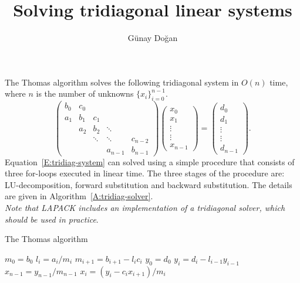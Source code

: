 \documentclass[10pt,a4paper]{article}
\author{G\"unay Do\u gan}
\title{Solving tridiagonal linear systems}
\begin{document}
\maketitle

The Thomas algorithm solves the following tridiagonal system in $O(n)$ time, 
where $n$ is the number of unknowns $\{x_i\}_{i=0}^{n-1}$.
%
\begin{equation}\label{E:tridiag-system}
{\scriptscriptstyle
  \left(\begin{array}{ccccc}
     b_0 & c_0 &        &         &         \\
     a_1 & b_1 &  c_1   &         &         \\
         & a_2 &  b_2   & \ddots  &         \\
         &     & \ddots & \ddots  & c_{n-2} \\
         &     &        & a_{n-1} & b_{n-1}
  \end{array}\right)
  \left(\begin{array}{c}
     x_0 \\ x_1 \\ \vdots \\ \vdots \\ x_{n-1}
  \end{array}\right)
  =
  \left(\begin{array}{c}
     d_0 \\ d_1 \\ \vdots \\ \vdots \\ d_{n-1}
  \end{array}\right).
}
\end{equation}
%
Equation~\eqref{E:tridiag-system} can solved using a simple
procedure that consists of three for-loops executed in linear
time. The three stages of the procedure are: LU-decomposition,
forward substitution and backward substitution. The details
are given in Algorithm~\ref{A:tridiag-solver}. \\
\emph{Note that LAPACK includes an implementation of
a tridiagonal solver, which should be used in practice}.

%
\begin{algorithm}
\caption{The Thomas algorithm}
\label{A:tridiag-solver}
\begin{algorithmic}
\STATE $m_0 = b_0$
	\STATE $l_i = a_i / m_i$
	\STATE $m_{i+1} = b_{i+1} - l_i c_i$
\ENDFOR
\STATE $y_0 = d_0$
	\STATE $y_i = d_i - l_{i-1} y_{i-1}$
\ENDFOR
\STATE $x_{n-1} = y_{n-1} / m_{n-1}$
	\STATE $x_i = (y_i - c_i x_{i+1}) / m_i$
\ENDFOR
\end{algorithmic}
\end{algorithm}
%
\end{document}

